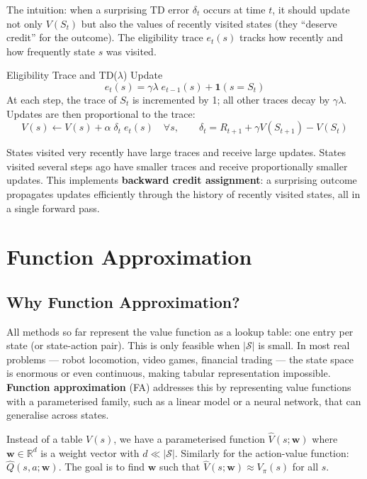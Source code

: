 \documentclass[11pt,a4paper]{article}
\newcommand{\R}{\mathbb{R}}
\newcommand{\term}[1]{\textcolor{DefGreen}{\textbf{#1}}}
\begin{document}
The intuition: when a surprising TD error $\delta_t$ occurs at time $t$, it should update not only $V(S_t)$ but also the values of recently visited states (they ``deserve credit'' for the outcome). The eligibility trace $e_t(s)$ tracks how recently and how frequently state $s$ was visited.

\begin{defbox}{Eligibility Trace and TD($\lambda$) Update}
\[
e_t(s) = \gamma\lambda\;e_{t-1}(s) + \mathbf{1}(s=S_t)
\]
At each step, the trace of $S_t$ is incremented by 1; all other traces decay by $\gamma\lambda$. Updates are then proportional to the trace:
\[
V(s) \leftarrow V(s) + \alpha\;\delta_t\;e_t(s) \quad \forall s, \qquad \delta_t = R_{t+1}+\gamma V(S_{t+1})-V(S_t)
\]
\end{defbox}

States visited very recently have large traces and receive large updates. States visited several steps ago have smaller traces and receive proportionally smaller updates. This implements \term{backward credit assignment}: a surprising outcome propagates updates efficiently through the history of recently visited states, all in a single forward pass.

\section{Function Approximation}

\subsection{Why Function Approximation?}

All methods so far represent the value function as a lookup table: one entry per state (or state-action pair). This is only feasible when $|\mathcal{S}|$ is small. In most real problems --- robot locomotion, video games, financial trading --- the state space is enormous or even continuous, making tabular representation impossible. \term{Function approximation} (FA) addresses this by representing value functions with a parameterised family, such as a linear model or a neural network, that can generalise across states.

Instead of a table $V(s)$, we have a parameterised function $\hat{V}(s;\mathbf{w})$ where $\mathbf{w}\in\R^d$ is a weight vector with $d \ll |\mathcal{S}|$. Similarly for the action-value function: $\hat{Q}(s,a;\mathbf{w})$. The goal is to find $\mathbf{w}$ such that $\hat{V}(s;\mathbf{w})\approx V_\pi(s)$ for all $s$.
\end{document}
